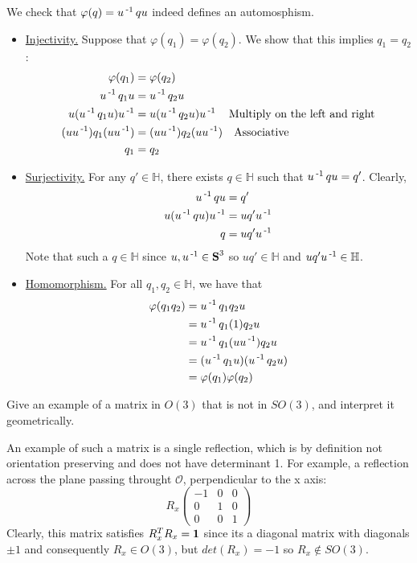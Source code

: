 \documentclass[11pt,onecolumn]{article}
\begin{document}
\begin{answer}
We check that $\varphi(q) = u\operatorname{^{-1}} q u$ indeed defines an automosphism.
\begin{itemize}
    \item \underline{Injectivity.} Suppose that $\varphi(q_1) = \varphi(q_2)$. We show that this implies $q_1 = q_2$:
    \begin{align*}
        \varphi(q_1) &= \varphi(q_2) \\
        u\operatorname{^{-1}} q_1 u &= u\operatorname{^{-1}} q_2 u \\
        u (u\operatorname{^{-1}} q_1 u) u\operatorname{^{-1}} &= u (u\operatorname{^{-1}} q_2 u) u\operatorname{^{-1}} \quad \text{Multiply on the left and right}\\
        (u u\operatorname{^{-1}}) q_1 (u u\operatorname{^{-1}}) &= (u u\operatorname{^{-1}}) q_2 (u u\operatorname{^{-1}}) \quad \text{Associative} \\
        q_1 &= q_2
    \end{align*}
    \item \underline{Surjectivity.} For any $q' \in \mathbb{H}$, there exists $q \in \mathbb{H}$ such that $u\operatorname{^{-1}} q u = q'$. Clearly,
    \begin{align*}
        u\operatorname{^{-1}} q u &= q' \\
        u (u\operatorname{^{-1}} q u) u\operatorname{^{-1}} &= u q' u\operatorname{^{-1}} \\
        q &= u q' u\operatorname{^{-1}} 
    \end{align*}
    Note that such a $q \in \mathbb{H}$ since $u,u\operatorname{^{-1}} \in \operatorname{\mathbf{S}}^3$ so $uq' \in \mathbb{H}$ and $uq'u\operatorname{^{-1}} \in \mathbb{H}$.
    \item \underline{Homomorphism.} For all $q_1,q_2 \in \mathbb{H}$, we have that
    \begin{align*}
        \varphi(q_1q_2) &= u\operatorname{^{-1}} q_1 q_2 u \\
        &= u\operatorname{^{-1}} q_1 (1) q_2 u \\
        &= u\operatorname{^{-1}} q_1 (u u\operatorname{^{-1}}) q_2 u \\
        &= (u\operatorname{^{-1}} q_1 u) (u\operatorname{^{-1}} q_2 u) \\
        &= \varphi(q_1) \varphi(q_2)
    \end{align*}
\end{itemize}
\end{answer}

\begin{exercise}
Give an example of a matrix in $O(3)$ that is not in $SO(3)$, and interpret it geometrically.
\end{exercise}
\begin{answer}
An example of such a matrix is a single reflection, which is by definition not orientation preserving and does not have determinant 1. For example, a reflection across the plane passing throught $\mathcal{O}$, perpendicular to the x axis:
$$ R_x \begin{pmatrix} -1 & 0 & 0 \\ 0 & 1 & 0 \\ 0 & 0 & 1 \end{pmatrix}$$
Clearly, this matrix satisfies $R_x^TR_x = \operatorname{\mathbf{1}}$ since its a diagonal matrix with diagonals $\pm 1$ and consequently $R_x \in O(3)$, but $det(R_x) = -1$ so $R_x \notin SO(3)$.
\end{answer}
\end{document}
